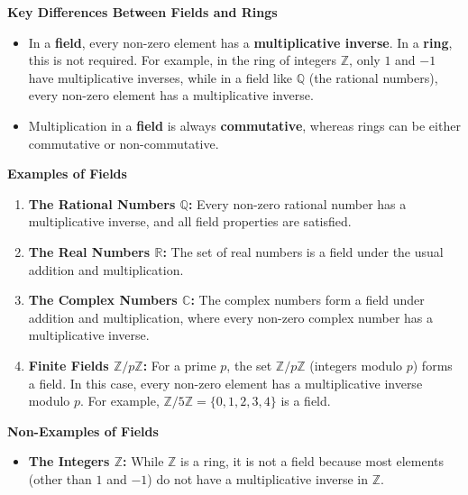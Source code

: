 \documentclass{article}
\begin{document}
\textbf{Key Differences Between Fields and Rings}
\begin{itemize}
    \item In a \textbf{field}, every non-zero element has a \textbf{multiplicative inverse}. In a \textbf{ring}, this is not required. For example, in the ring of integers \( \mathbb{Z} \), only \( 1 \) and \( -1 \) have multiplicative inverses, while in a field like \( \mathbb{Q} \) (the rational numbers), every non-zero element has a multiplicative inverse.
    \item Multiplication in a \textbf{field} is always \textbf{commutative}, whereas rings can be either commutative or non-commutative.
\end{itemize}

\textbf{Examples of Fields}

\begin{enumerate}
    \item \textbf{The Rational Numbers \(\mathbb{Q}\):} Every non-zero rational number has a multiplicative inverse, and all field properties are satisfied.
   
    \item \textbf{The Real Numbers \(\mathbb{R}\):} The set of real numbers is a field under the usual addition and multiplication.
   
    \item \textbf{The Complex Numbers \(\mathbb{C}\):} The complex numbers form a field under addition and multiplication, where every non-zero complex number has a multiplicative inverse.
   
    \item \textbf{Finite Fields \(\mathbb{Z}/p\mathbb{Z}\):} For a prime \( p \), the set \(\mathbb{Z}/p\mathbb{Z}\) (integers modulo \(p\)) forms a field. In this case, every non-zero element has a multiplicative inverse modulo \( p \). For example, \(\mathbb{Z}/5\mathbb{Z} = \{0, 1, 2, 3, 4\}\) is a field.
\end{enumerate}

\textbf{Non-Examples of Fields}
\begin{itemize}
    \item \textbf{The Integers \(\mathbb{Z}\):} While \(\mathbb{Z}\) is a ring, it is not a field because most elements (other than \(1\) and \(-1\)) do not have a multiplicative inverse in \(\mathbb{Z}\).
\end{itemize}

\end{document}
